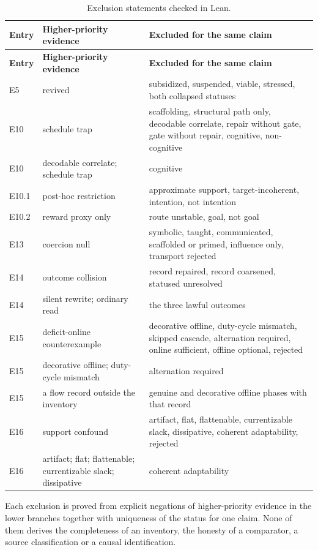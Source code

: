 {\small
\begin{longtable}{@{}l>{\raggedright\arraybackslash}p{4.4cm}>{\raggedright\arraybackslash}p{8.8cm}@{}}
\caption{Exclusion statements checked in Lean.}\label{tab:exclusions}\\
\toprule
\textbf{Entry} & \textbf{Higher-priority evidence} & \textbf{Excluded for the same claim} \\
\midrule
\endfirsthead
\toprule
\textbf{Entry} & \textbf{Higher-priority evidence} & \textbf{Excluded for the same claim} \\
\midrule
\endhead
\bottomrule
\endfoot
E5 & revived & subsidized, suspended, viable, stressed, both collapsed statuses \\
E10 & schedule trap & scaffolding, structural path only, decodable correlate, repair without gate,
gate without repair, cognitive, non-cognitive \\
E10 & decodable correlate; schedule trap & cognitive \\
E10.1 & post-hoc restriction & approximate support, target-incoherent, intention, not intention \\
E10.2 & reward proxy only & route unstable, goal, not goal \\
E13 & coercion null & symbolic, taught, communicated, scaffolded or primed, influence only, transport
rejected \\
E14 & outcome collision & record repaired, record coarsened, statused unresolved \\
E14 & silent rewrite; ordinary read & the three lawful outcomes \\
E15 & deficit-online counterexample & decorative offline, duty-cycle mismatch, skipped cascade,
alternation required, online sufficient, offline optional, rejected \\
E15 & decorative offline; duty-cycle mismatch & alternation required \\
E15 & a flow record outside the inventory & genuine and decorative offline phases with that record \\
E16 & support confound & artifact, flat, flattenable, currentizable slack, dissipative, coherent
adaptability, rejected \\
E16 & artifact; flat; flattenable; currentizable slack; dissipative & coherent adaptability \\
\end{longtable}
}

Each exclusion is proved from explicit negations of higher-priority evidence in the lower branches
together with uniqueness of the status for one claim. None of them derives the completeness of an
inventory, the honesty of a comparator, a source classification or a causal identification.

